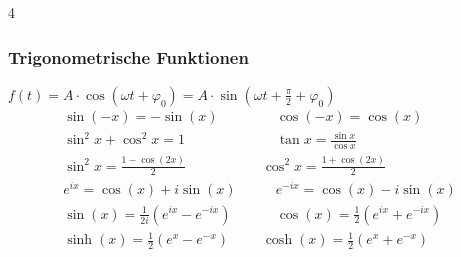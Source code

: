 \documentclass[6pt,a4paper]{scrartcl}
\newcommand{\enbrace}[1]{\ensuremath{\left(#1\right)}}
\begin{document}
\begin{multicols*}{4}
    \subsubsection{Trigonometrische Funktionen}
    $f(t)=A\cdot \cos(\omega t + \varphi_0)=A\cdot \sin(\omega t + \frac{\pi}{2}+ \varphi_0)$
    \begin{eqnarray*}
        \sin (-x) = -\sin (x)  \quad & \quad \cos (-x) = \cos (x) \\
        \sin^2 x + \cos^2 x = 1  \quad & \quad \tan x = \frac{\sin x}{\cos x} \\
        \sin^2 x = \frac{1 - \cos(2x)}{2} &\cos^2 x=\frac{1 + \cos(2x)}{2} \\
        e^{ix}=\cos(x)+i\sin(x) \quad & \quad e^{-ix}=\cos(x)-i\sin(x) \\
        \sin(x)=\frac{1}{2i}\enbrace{e^{ix}-e^{-ix}} \quad & \quad \cos(x)=\frac{1}{2}\enbrace{e^{ix}+e^{-ix}} \\
        \sinh(x)=\frac{1}{2}(e^x-e^{-x}) & \cosh(x)=\frac{1}{2}(e^x+e^{-x})
    \end{eqnarray*}

\end{multicols*}
\end{document}
